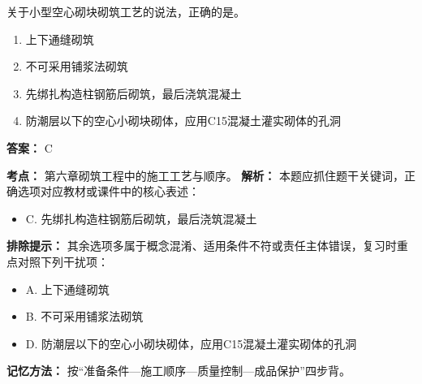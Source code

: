 \documentclass[UTF8,fontset=fandol,11pt]{ctexart}
\begin{document}
\begin{quizbox}[title={第 29 题}]
关于小型空心砌块砌筑工艺的说法，正确的是。\\
\begin{enumerate}[label=\Alph*.]
\item 上下通缝砌筑
\item 不可采用铺浆法砌筑
\item 先绑扎构造柱钢筋后砌筑，最后浇筑混凝土
\item 防潮层以下的空心小砌块砌体，应用C15混凝土灌实砌体的孔洞
\end{enumerate}
\textbf{答案：} C
\vspace{0.25em}
\begin{answerbox}[title={考点解析}]
\textbf{考点：} 第六章砌筑工程中的施工工艺与顺序。
\textbf{解析：} 本题应抓住题干关键词，正确选项对应教材或课件中的核心表述：
\begin{itemize}
\item C. 先绑扎构造柱钢筋后砌筑，最后浇筑混凝土
\end{itemize}
\textbf{排除提示：} 其余选项多属于概念混淆、适用条件不符或责任主体错误，复习时重点对照下列干扰项：
\begin{itemize}
\item A. 上下通缝砌筑
\item B. 不可采用铺浆法砌筑
\item D. 防潮层以下的空心小砌块砌体，应用C15混凝土灌实砌体的孔洞
\end{itemize}
\textbf{记忆方法：} 按“准备条件—施工顺序—质量控制—成品保护”四步背。
\end{answerbox}
\end{quizbox}

\vspace{0.2em}
\end{document}
